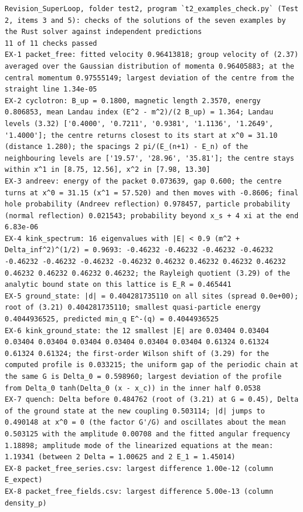 \documentclass[
  10pt,
]{article}
\begin{document}
\begin{verbatim}
Revision_SuperLoop, folder test2, program `t2_examples_check.py` (Test 2, items 3 and 5): checks of the solutions of the seven examples by the Rust solver against independent predictions
11 of 11 checks passed
EX-1 packet_free: fitted velocity 0.96413818; group velocity of (2.37) averaged over the Gaussian distribution of momenta 0.96405883; at the central momentum 0.97555149; largest deviation of the centre from the straight line 1.34e-05
EX-2 cyclotron: B_up = 0.1800, magnetic length 2.3570, energy 0.806853, mean Landau index (E^2 - m^2)/(2 B_up) = 1.364; Landau levels (3.32) ['0.4000', '0.7211', '0.9381', '1.1136', '1.2649', '1.4000']; the centre returns closest to its start at x^0 = 31.10 (distance 1.280); the spacings 2 pi/(E_(n+1) - E_n) of the neighbouring levels are ['19.57', '28.96', '35.81']; the centre stays within x^1 in [8.75, 12.56], x^2 in [7.98, 13.30]
EX-3 andreev: energy of the packet 0.073639, gap 0.600; the centre turns at x^0 = 31.15 (x^1 = 57.520) and then moves with -0.8606; final hole probability (Andreev reflection) 0.978457, particle probability (normal reflection) 0.021543; probability beyond x_s + 4 xi at the end 6.83e-06
EX-4 kink_spectrum: 16 eigenvalues with |E| < 0.9 (m^2 + Delta_inf^2)^(1/2) = 0.9693: -0.46232 -0.46232 -0.46232 -0.46232 -0.46232 -0.46232 -0.46232 -0.46232 0.46232 0.46232 0.46232 0.46232 0.46232 0.46232 0.46232 0.46232; the Rayleigh quotient (3.29) of the analytic bound state on this lattice is E_R = 0.465441
EX-5 ground_state: |d| = 0.404281735110 on all sites (spread 0.0e+00); root of (3.21) 0.404281735110; smallest quasi-particle energy 0.4044936525, predicted min_q E^-(q) = 0.4044936525
EX-6 kink_ground_state: the 12 smallest |E| are 0.03404 0.03404 0.03404 0.03404 0.03404 0.03404 0.03404 0.03404 0.61324 0.61324 0.61324 0.61324; the first-order Wilson shift of (3.29) for the computed profile is 0.033215; the uniform gap of the periodic chain at the same G is Delta_0 = 0.598960; largest deviation of the profile from Delta_0 tanh(Delta_0 (x - x_c)) in the inner half 0.0538
EX-7 quench: Delta before 0.484762 (root of (3.21) at G = 0.45), Delta of the ground state at the new coupling 0.503114; |d| jumps to 0.490148 at x^0 = 0 (the factor G'/G) and oscillates about the mean 0.503125 with the amplitude 0.00708 and the fitted angular frequency 1.18898; amplitude mode of the linearized equations at the mean: 1.19341 (between 2 Delta = 1.00625 and 2 E_1 = 1.45014)
EX-8 packet_free_series.csv: largest difference 1.00e-12 (column E_expect)
EX-8 packet_free_fields.csv: largest difference 5.00e-13 (column density_p)

\end{verbatim}
\end{document}
